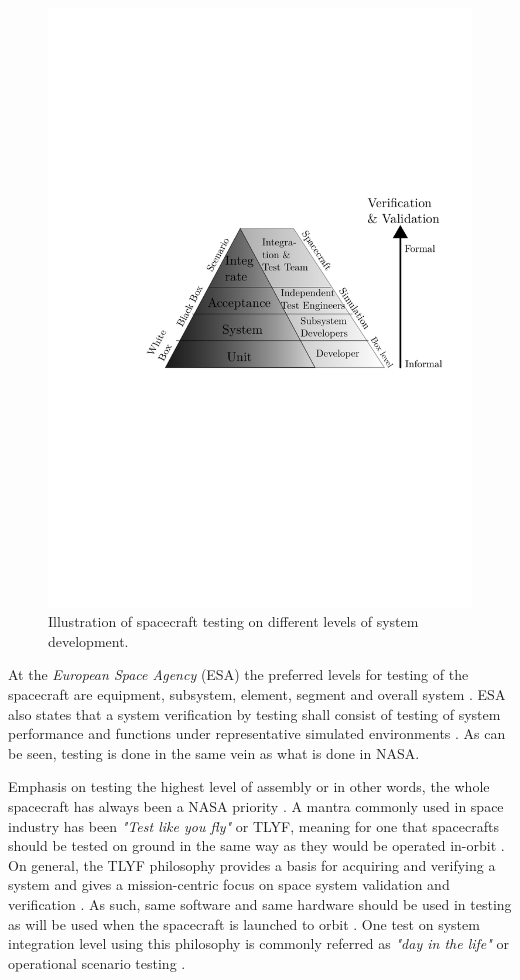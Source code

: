 \documentclass[english,12pt,a4paper,pdftex,elec,utf8]{aaltothesis}
\begin{document}
\begin{figure}[h!]
\centering
\includegraphics[scale=0.8]{spacetestingnew}
\caption{Illustration of spacecraft testing on different levels of system development. \cite{softacceptancespace, tor}}
\label{testlevelchart}
\end{figure}
At the \textit{European Space Agency} (ESA) the preferred levels for testing of the spacecraft are equipment, subsystem, element, segment and overall system \cite{ecss}. ESA also states that a system verification by testing shall consist of testing of system performance and functions under representative simulated environments \cite{ecss}. As can be seen, testing is done in the same vein as what is done in NASA. \par 
Emphasis on testing the highest level of assembly or in other words, the whole spacecraft has always been a NASA priority \cite{reliabilitylessonsfromnasa}. A mantra commonly used in space industry has been \textit{"Test like you fly"} or TLYF, meaning for one that spacecrafts should be tested on ground in the same way as they would be operated in-orbit \cite{satverplanning, tor}.  On general, the TLYF philosophy provides a basis for acquiring and verifying a system and gives a mission-centric focus on space system validation and verification \cite{tor}. As such, same software and same hardware should be used in testing as will be used when the spacecraft is launched to orbit \cite{satverplanning}. One test on system integration level using this philosophy is commonly referred as \textit{"day in the life"} or operational scenario testing \cite{satverplanning, tor}. \par
\end{document}
